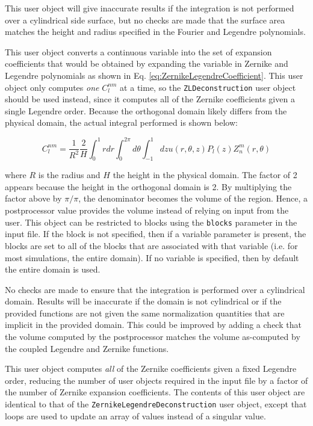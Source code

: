 \documentclass[10pt]{article}
\newcommand{\beq}{\begin{equation}}
\newcommand{\eeq}{\end{equation}}
\newcounter{subsubsubsection}[subsubsection]
\numberwithin{equation}{section} %
\begin{document}
\color{magenta}
This user object will give inaccurate results if the integration is not performed over a cylindrical side surface, but no checks are made that the surface area matches the height and radius specified in the Fourier and Legendre polynomials.
\color{black}

This user object converts a continuous variable into the set of expansion coefficients that would be obtained by expanding the variable in Zernike and Legendre polynomials as shown in Eq. \eqref{eq:ZernikeLegendreCoefficient}. This user object only computes {\it one} \(C_l^{nm}\) at a time, so the {\tt ZLDeconstruction} user object should be used instead, since it computes all of the Zernike coefficients given a single Legendre order. Because the orthogonal domain likely differs from the physical domain, the actual integral performed is shown below:

\beq
C_l^{nm}=\frac{1}{R^2}\frac{2}{H}\int_0^1rdr\int_{0}^{2\pi}d\theta\int_{-1}^{1}dzu(r,\theta,z)P_l(z)Z_n^m(r,\theta)
\eeq

where \(R\) is the radius and \(H\) the height in the physical domain. The factor of 2 appears because the height in the orthogonal domain is 2. By multiplying the factor above by \(\pi/\pi\), the denominator becomes the volume of the region. Hence, a postprocessor value provides the volume instead of relying on input from the user. This object can be restricted to blocks using the {\tt blocks} parameter in the input file. If the block is not specified, then if a variable parameter is present, the blocks are set to all of the blocks that are associated with that variable (i.e. for most simulations, the entire domain). If no variable is specified, then by default the entire domain is used. 

\color{magenta}
No checks are made to ensure that the integration is performed over a cylindrical domain. Results will be inaccurate if the domain is not cylindrical or if the provided functions are not given the same normalization quantities that are implicit in the provided domain. This could be improved by adding a check that the volume computed by the postprocessor matches the volume as-computed by the coupled Legendre and Zernike functions.
\color{black}

This user object computes {\it all} of the Zernike coefficients given a fixed Legendre order, reducing the number of user objects required in the input file by a factor of the number of Zernike expansion coefficients. The contents of this user object are identical to that of the {\tt ZernikeLegendreDeconstruction} user object, except that loops are used to update an array of values instead of a singular value.
\end{document}
